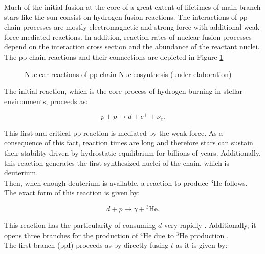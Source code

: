 \documentclass[openany]{book}
\begin{document}
Much of the initial fusion at the core of a great extent of lifetimes of main branch stars like the sun consist on hydrogen fusion reactions. The interactions of pp-chain processes are mostly electromagnetic and strong force with additional weak force mediated reactions. In addition, reaction rates of nuclear fusion processes depend on the interaction cross section and the abundance of the reactant nuclei. \\

The pp chain reactions and their connections are depicted in Figure \ref{fig:nuclerReactionppChain}

\begin{figure}[H]
	
	\caption[Nuclear reactions of pp chain Nucleosynthesis]{Nuclear reactions of pp chain Nucleosynthesis (under elaboration)}
	\label{fig:nuclerReactionppChain}
\end{figure}


The initial reaction, which is the core process of hydrogen burning in stellar environments, proceeds as:  

\begin{equation} \label{eq:reaction_ppMain}
	p + p \rightarrow d + e^{+} + \nu_e.
\end{equation}

This first and critical pp reaction is mediated by the weak force. As a consequence of this fact, reaction times are long and therefore stars can sustain their stability driven by hydrostatic equilibrium for billions of years. Additionally, this reaction generates the first synthesized nuclei of the chain, which is deuterium. \\

Then, when enough deuterium is available, a reaction to produce ${}^{3} \mathrm{He}$ follows. The exact form of this reaction is given by: 

\begin{equation} \label{eq:reaction_2Hpgamma3He}
	d + p  \rightarrow \gamma + {}^{3} \mathrm{He}.
\end{equation}

This reaction has the particularity of consuming $d$ very rapidly \cite{bertulani_2003}. Additionally, it opens three branches for the production of $\mathrm{{}^{4}He}$ due to ${}^{3} \mathrm{He}$ production \cite{fowler_1958}.\\

The first branch (ppI) proceeds as by directly fusing $t$ as it is given by: 
\end{document}
